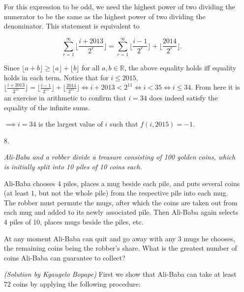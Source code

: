 \documentclass{article}
\begin{document}
\begin{enumerate}
For this expression to be odd, we need the highest power of two dividing the numerator to be the same as the highest power of two dividing the denominator. This statement is equivalent to

$$\sum_{r = 1}^{\infty} \lfloor{\frac{i + 2013}{2^r}}\rfloor = \sum_{r = 1}^{\infty}\lfloor \frac{i - 1}{2^r} \rfloor + \lfloor \frac{2014}{2^r} \rfloor.$$

Since $\lfloor a + b \rfloor \ge \lfloor a \rfloor + \lfloor b \rfloor$ for all $a, b \in \mathbb{R}$, the above equality holds iff equality holds in each term. Notice that for $i \le 2015$, $\lfloor \frac{i + 2013}{2^{11}} \rfloor = \lfloor \frac{i - 1}{2^{11}} \rfloor + \lfloor \frac{2014}{2^{11}} \rfloor \iff i + 2013 < 2^{11} \iff i < 35 \iff i \le 34$. From here it is an exercise in arithmetic to confirm that $i = 34$ does indeed satisfy the equality of the infinite sums.

$\implies i = 34$ is the largest value of $i$ such that $f(i, 2015) = -1$.

\medskip
\item[8.] %
{\itshape Ali-Baba and a robber divide a treasure consisting of 100 golden coins, which is initially split into 10 piles of 10 coins each.

Ali-Baba chooses 4 piles, places a mug beside each pile, and puts several coins (at least $1$, but not the whole pile) from the respective pile into each mug.
The robber must permute the mugs, after which the coins are taken out from each mug and added to its newly associated pile.
Then Ali-Baba again selects 4 piles of 10, places mugs beside the piles, etc.

At any moment Ali-Baba can quit and go away with any 3 mugs he chooses, the remaining coins being the robber's share.
What is the greatest number of coins Ali-Baba can guarantee to collect?}

\textit{(Solution by Kgaugelo Bopape)}
First we show that Ali-Baba can take at least $72$ coins by applying the following
procedure:
	

\end{enumerate}
\end{document}

